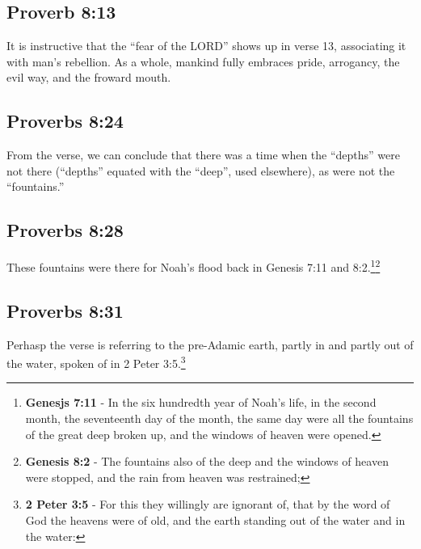 \subsection{Proverb 8:13}
It is instructive that the ``fear of the LORD'' shows up in verse 13, associating it with man's rebellion. As a whole, mankind fully embraces pride, arrogancy, the evil way, and the froward mouth.

\subsection{Proverbs 8:24}
From the verse, we can conclude that there was a time when the ``depths'' were not there (``depths'' equated with the ``deep'', used elsewhere), as were not the ``fountains.''

\subsection{Proverbs 8:28}
These fountains were there for Noah's flood back in Genesis 7:11 and 8:2.\footnote{\textbf{Genesjs 7:11} - In the six hundredth year of Noah’s life, in the second month, the seventeenth day of the month, the same day were all the fountains of the great deep broken up, and the windows of heaven were opened.}\footnote{\textbf{Genesis 8:2} - The fountains also of the deep and the windows of heaven were stopped, and the rain from heaven was restrained;}


\subsection{Proverbs 8:31}
Perhasp the verse is referring to the pre-Adamic earth, partly in and partly out of the water, spoken of in 2 Peter 3:5.\footnote{\textbf{2 Peter 3:5} - For this they willingly are ignorant of, that by the word of God the heavens were of old, and the earth standing out of the water and in the water:}